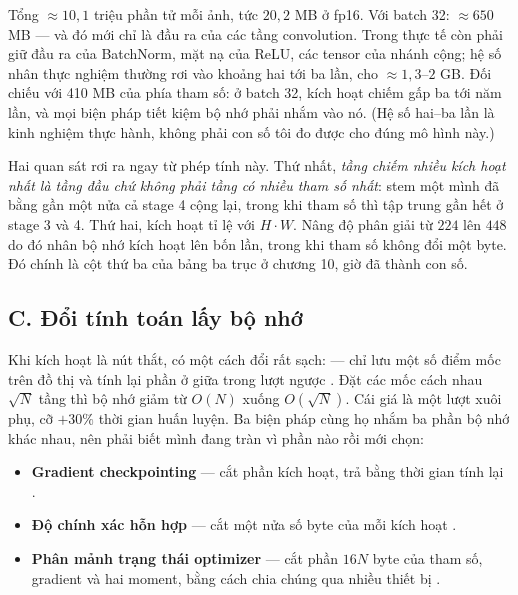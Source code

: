 \documentclass[../../deep_learning.tex]{subfiles}
\begin{document}
Tổng \(\approx 10{,}1\) triệu phần tử mỗi ảnh, tức \(20{,}2\) MB ở fp16. Với batch 32: \(\approx 650\) MB --- và đó mới chỉ là đầu ra của các tầng convolution. Trong thực tế còn phải giữ đầu ra của BatchNorm, mặt nạ của ReLU, các tensor của nhánh cộng; hệ số nhân thực nghiệm thường rơi vào khoảng hai tới ba lần, cho \(\approx 1{,}3\)--\(2\) GB. Đối chiếu với 410 MB của phía tham số: ở batch 32, kích hoạt chiếm gấp ba tới năm lần, và mọi biện pháp tiết kiệm bộ nhớ phải nhắm vào nó. (Hệ số hai--ba lần là kinh nghiệm thực hành, không phải con số tôi đo được cho đúng mô hình này.)

Hai quan sát rơi ra ngay từ phép tính này. Thứ nhất, \emph{tầng chiếm nhiều kích hoạt nhất là tầng đầu chứ không phải tầng có nhiều tham số nhất}: stem một mình đã bằng gần một nửa cả stage 4 cộng lại, trong khi tham số thì tập trung gần hết ở stage 3 và 4. Thứ hai, kích hoạt tỉ lệ với \(H\cdot W\). Nâng độ phân giải từ \(224\) lên \(448\) do đó nhân bộ nhớ kích hoạt lên bốn lần, trong khi tham số không đổi một byte. Đó chính là cột thứ ba của bảng ba trục ở chương 10, giờ đã thành con số.

\subsection{C. Đổi tính toán lấy bộ nhớ}

Khi kích hoạt là nút thắt, có một cách đổi rất sạch:  --- chỉ lưu một số điểm mốc trên đồ thị và tính lại phần ở giữa trong lượt ngược \cite{chen2016training}. Đặt các mốc cách nhau \(\sqrt{N}\) tầng thì bộ nhớ giảm từ \(O(N)\) xuống \(O(\sqrt{N})\). Cái giá là một lượt xuôi phụ, cỡ \(+30\%\) thời gian huấn luyện. Ba biện pháp cùng họ nhắm ba phần bộ nhớ khác nhau, nên phải biết mình đang tràn vì phần nào rồi mới chọn:

\begin{itemize}
\item \textbf{Gradient checkpointing} --- cắt phần kích hoạt, trả bằng thời gian tính lại \cite{chen2016training}.
\item \textbf{Độ chính xác hỗn hợp} --- cắt một nửa số byte của mỗi kích hoạt \cite{micikevicius2018mixed}.
\item \textbf{Phân mảnh trạng thái optimizer} --- cắt phần \(16N\) byte của tham số, gradient và hai moment, bằng cách chia chúng qua nhiều thiết bị \cite{rajbhandari2020zero}.
\end{itemize}
\end{document}
